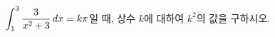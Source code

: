 \hspace*{2mm}\begin{minipage}[t]{\dimexpr\linewidth-2mm\relax}\vspace{0pt}
$\displaystyle\int_{1}^{3}\dfrac{3}{x^2+3}\mkern3mu dx=k\pi$일 때, 상수 $k$에 대하여 $k^2$의 값을 구하시오.\end{minipage}
